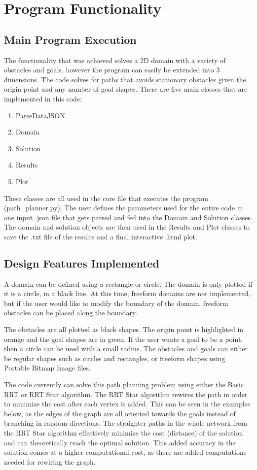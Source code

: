 \section{Program Functionality}
	\subsection{Main Program Execution}
		The functionality that was achieved solves a 2D domain with a variety of obstacles and goals, however the program can easily be extended into 3 dimensions. The code solves for paths that avoids stationary obstacles given the origin point and any number of goal shapes. 
		There are five main classes that are implemented in this code:
		\begin{enumerate}
			\item ParseDataJSON
			\item Domain
			\item Solution
			\item Results
			\item Plot
		\end{enumerate}
		These classes are all used in the core file that executes the program (path\_planner.py). The user defines the parameters used for the entire code in one input .json file that gets parsed and fed into the Domain and Solution classes. The domain and solution objects are then used in the Results and Plot classes to save the .txt file of the results and a final interactive .html plot.  
	
	
	\subsection{Design Features Implemented}
		A domain can be defined using a rectangle or circle. The domain is only plotted if it is a circle, in a black line. At this time, freeform domains are not implemented, but if the user would like to modify the boundary of the domain, freeform obstacles can be placed along the boundary. 
		
		The obstacles are all plotted as black shapes. The origin point is highlighted in orange and the goal shapes are in green. If the user wants a goal to be a point, then a circle can be used with a small radius. The obstacles and goals can either be regular shapes such as circles and rectangles, or freeform shapes using Portable Bitmap Image files. 
		
		The code currently can solve this path planning problem using either the Basic RRT or RRT Star algorithm. The RRT Star algorithm rewires the path in order to minimize the cost after each vertex is added. This can be seen in the examples below, as the edges of the graph are all oriented towards the goals instead of branching in random directions. The straighter paths in the whole network from the RRT Star algorithm effectively minimize the cost (distance) of the solution and can theoretically reach the optimal solution. This added accuracy in the solution comes at a higher computational cost, as there are added computations needed for rewiring the graph.  
		
